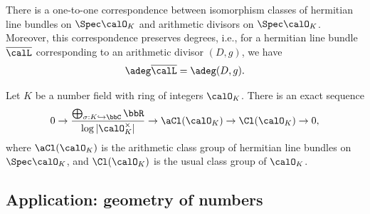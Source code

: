     \begin{proposition}\label{prop:arithmetic_divisor_line_bundle_correspondence}
        There is a one-to-one correspondence between isomorphism classes of hermitian line bundles on \(\Spec \calO_K\) and arithmetic divisors on \(\Spec \calO_K\). 
        Moreover, this correspondence preserves degrees, i.e., for a hermitian line bundle \(\overline{\calL}\) corresponding to an arithmetic divisor \((D, g)\), we have
        \[
            \adeg \overline{\calL} = \adeg (D, g).
        \]
        
    \end{proposition}

    \begin{proposition}\label{prop:exact_sequence_of_several_class_groups}
        Let \(K\) be a number field with ring of integers \(\calO_K\).
        There is an exact sequence
        \[
            0 \to \frac{\bigoplus_{\sigma: K \hookrightarrow \bbC} \bbR}{\log |\calO_K^\times|} \to \aCl(\calO_K) \to \Cl(\calO_K) \to 0,
        \]
        where \(\aCl(\calO_K)\) is the arithmetic class group of hermitian line bundles on \(\Spec \calO_K\), and \(\Cl(\calO_K)\) is the usual class group of \(\calO_K\).
    \end{proposition}


\subsection{Application: geometry of numbers}
